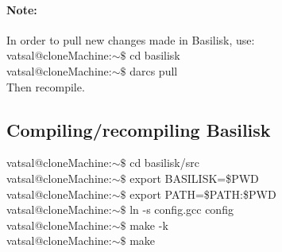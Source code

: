 \documentclass[]{article}
\begin{document}
\paragraph{\textbf{Note:}} In order to pull new changes made in Basilisk, use:\\
{\color{red}vatsal@cloneMachine:$\sim\$$} cd basilisk\\
{\color{red}vatsal@cloneMachine:$\sim\$$} darcs pull\\
Then recompile.
\subsection{Compiling/recompiling Basilisk}
{\color{red}vatsal@cloneMachine:$\sim\$$} cd basilisk/src\\
{\color{red}vatsal@cloneMachine:$\sim\$$} export BASILISK=\$PWD\\
{\color{red}vatsal@cloneMachine:$\sim\$$} export PATH=\$PATH:\$PWD\\
{\color{red}vatsal@cloneMachine:$\sim\$$} ln -s config.gcc config\\
{\color{red}vatsal@cloneMachine:$\sim\$$} make -k\\
{\color{red}vatsal@cloneMachine:$\sim\$$} make
\end{document}
